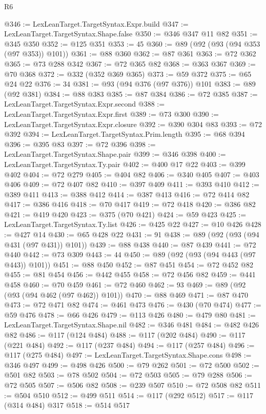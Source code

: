 \begin{lexlean}{R6}
\begin{coremodule}
@346 := LexLeanTarget.TargetSyntax.Expr.build
@347 := LexLeanTarget.TargetSyntax.Shape.false
@350 := @346 @347 @11 @82
@351 := @345 @350
@352 := @125 @351
@353 := 45
@360 := @89 (@92 (@93 (@94 @353 (@97 @353)) @101))
@361 := @88 @360
@362 := @87 @361
@363 := @72 @362
@365 := @73 @288 @342
@367 := @72 @365 @82
@368 := @363 @367
@369 := @70 @368
@372 := @332 (@352 @369 @365)
@373 := @59 @372
@375 := @65 @24 @22
@376 := 34
@381 := @93 (@94 @376 (@97 @376)) @101
@383 := @89 (@92 @381)
@384 := @88 @383
@385 := @87 @384
@386 := @72 @385
@387 := LexLeanTarget.TargetSyntax.Expr.second
@388 := LexLeanTarget.TargetSyntax.Expr.first
@389 := @73 @300
@390 := LexLeanTarget.TargetSyntax.Expr.closure
@392 := @390 @304 @83
@393 := @72 @392
@394 := LexLeanTarget.TargetSyntax.Prim.length
@395 := @68 @394
@396 := @395 @83
@397 := @72 @396
@398 := LexLeanTarget.TargetSyntax.Shape.pair
@399 := @346 @398
@400 := LexLeanTarget.TargetSyntax.Ty.pair
@402 := @400 @17 @22
@403 := @399 @402
@404 := @72 @279
@405 := @404 @82
@406 := @340 @405
@407 := @403 @406
@409 := @72 @407 @82
@410 := @397 @409
@411 := @393 @410
@412 := @389 @411
@413 := @388 @412
@414 := @387 @413
@416 := @72 @414 @82
@417 := @386 @416
@418 := @70 @417
@419 := @72 @418
@420 := @386 @82
@421 := @419 @420
@423 := @375 (@70 @421)
@424 := @59 @423
@425 := LexLeanTarget.TargetSyntax.Ty.list
@426 := @425 @22
@427 := @10 @426
@428 := @427 @14
@430 := @65 @428 @22
@431 := 91
@438 := @89 (@92 (@93 (@94 @431 (@97 @431)) @101))
@439 := @88 @438
@440 := @87 @439
@441 := @72 @440
@442 := @73 @309
@443 := 44
@450 := @89 (@92 (@93 (@94 @443 (@97 @443)) @101))
@451 := @88 @450
@452 := @87 @451
@454 := @72 @452 @82
@455 := @81 @454
@456 := @442 @455
@458 := @72 @456 @82
@459 := @441 @458
@460 := @70 @459
@461 := @72 @460
@462 := 93
@469 := @89 (@92 (@93 (@94 @462 (@97 @462)) @101))
@470 := @88 @469
@471 := @87 @470
@473 := @72 @471 @82
@474 := @461 @473
@476 := @430 (@70 @474)
@477 := @59 @476
@478 := @66 @426
@479 := @113 @426
@480 := @479 @80
@481 := LexLeanTarget.TargetSyntax.Shape.nil
@482 := @346 @481
@484 := @482 @426 @82
@486 := @117 (@124 @484)
@488 := @117 (@202 @484)
@490 := @117 (@221 @484)
@492 := @117 (@237 @484)
@494 := @117 (@257 @484)
@496 := @117 (@275 @484)
@497 := LexLeanTarget.TargetSyntax.Shape.cons
@498 := @346 @497
@499 := @498 @426
@500 := @79 @262
@501 := @72 @500
@502 := @501 @82
@503 := @78 @502
@504 := @72 @503
@505 := @79 @288
@506 := @72 @505
@507 := @506 @82
@508 := @239 @507
@510 := @72 @508 @82
@511 := @504 @510
@512 := @499 @511
@514 := @117 (@292 @512)
@517 := @117 (@314 @484) @317
@518 := @514 @517

\end{coremodule}
\end{lexlean}
